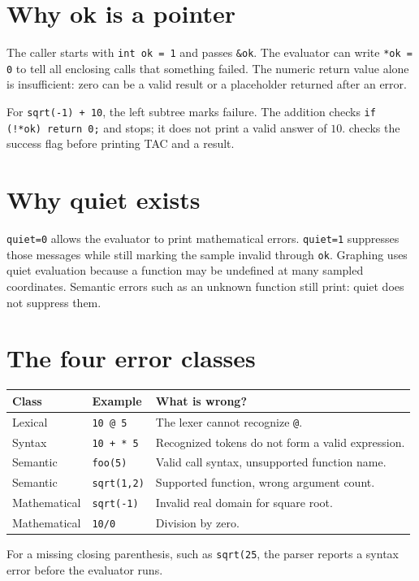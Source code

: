 \documentclass[11pt,a4paper]{report}
\newcommand{\file}[1]{\texttt{\detokenize{#1}}}
\begin{document}
\section{Why ok is a pointer}
The caller starts with \texttt{int ok = 1} and passes \texttt{\&ok}.
The evaluator can write \texttt{*ok = 0} to tell all enclosing calls that
something failed. The numeric return value alone is insufficient: zero can
be a valid result or a placeholder returned after an error.

For \texttt{sqrt(-1) + 10}, the left subtree marks failure. The addition
checks \texttt{if (!*ok) return 0;} and stops; it does not print a valid answer
of $10$. \file{src/calc.c} checks the success flag before printing TAC and a result.

\section{Why quiet exists}
\texttt{quiet=0} allows the evaluator to print mathematical errors.
\texttt{quiet=1} suppresses those messages while still marking the sample
invalid through \texttt{ok}. Graphing uses quiet evaluation because a function
may be undefined at many sampled coordinates. Semantic errors such as an
unknown function still print: quiet does not suppress them.

\section{The four error classes}
\begin{center}
\begin{tabularx}{\textwidth}{@{}llX@{}}
\toprule
Class & Example & What is wrong?\\
\midrule
Lexical & \texttt{10 @ 5} & The lexer cannot recognize \texttt{@}.\\
Syntax & \texttt{10 + * 5} & Recognized tokens do not form a valid expression.\\
Semantic & \texttt{foo(5)} & Valid call syntax, unsupported function name.\\
Semantic & \texttt{sqrt(1,2)} & Supported function, wrong argument count.\\
Mathematical & \texttt{sqrt(-1)} & Invalid real domain for square root.\\
Mathematical & \texttt{10/0} & Division by zero.\\
\bottomrule
\end{tabularx}
\end{center}
For a missing closing parenthesis, such as \texttt{sqrt(25}, the parser
reports a syntax error before the evaluator runs.
\end{document}
